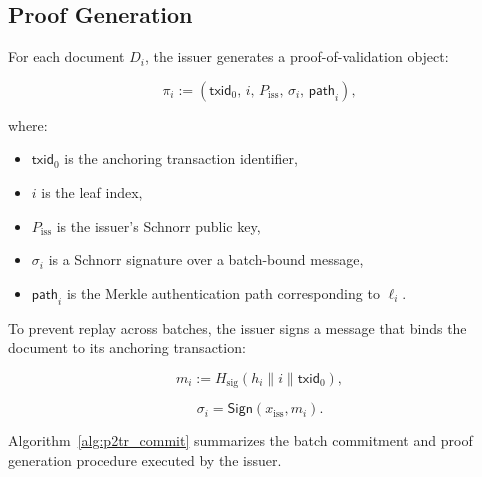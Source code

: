 \documentclass[preprint,12pt]{elsarticle}
\begin{document}
\subsection{Proof Generation}
\label{sec:proof_generation}

For each document $D_i$, the issuer generates a proof-of-validation object:

\begin{equation}
\pi_i := (\mathsf{txid}_0,\, i,\, P_{\mathrm{iss}},\, \sigma_i,\, \mathsf{path}_i),
\label{eq:proof}
\end{equation}

where:
\begin{itemize}
    \item $\mathsf{txid}_0$ is the anchoring transaction identifier,
    \item $i$ is the leaf index,
    \item $P_{\mathrm{iss}}$ is the issuer’s Schnorr public key,
    \item $\sigma_i$ is a Schnorr signature over a batch-bound message,
    \item $\mathsf{path}_i$ is the Merkle authentication path corresponding to $\ell_i$.
\end{itemize}

To prevent replay across batches, the issuer signs a message that binds the document to its anchoring transaction:

\begin{equation}
m_i := H_{\mathrm{sig}}(h_i \parallel i \parallel \mathsf{txid}_0),
\label{eq:signed_message}
\end{equation}

\begin{equation}
\sigma_i = \textsf{Sign}(x_{\mathrm{iss}}, m_i).
\label{eq:schnorr_signature}
\end{equation}

Algorithm~\ref{alg:p2tr_commit} summarizes the batch commitment and proof generation procedure executed by the issuer.
\end{document}
